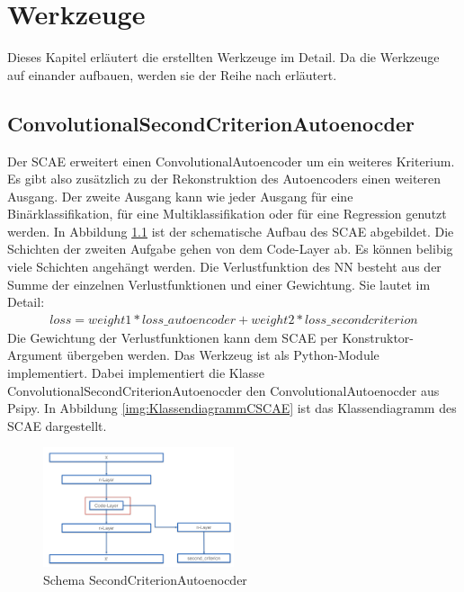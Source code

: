 \listoftodos


\chapter{Werkzeuge}
\label{chap:Werkzeuge}
Dieses Kapitel erläutert die erstellten Werkzeuge im Detail. Da die Werkzeuge auf einander aufbauen, werden sie der Reihe nach erläutert. 

	\section{ConvolutionalSecondCriterionAutoenocder}
	\label{sec:SecondCriterionAutoenocder}
	Der SCAE erweitert einen ConvolutionalAutoencoder um ein weiteres Kriterium. Es gibt also zusätzlich zu der Rekonstruktion des Autoencoders einen weiteren Ausgang. Der zweite Ausgang kann wie jeder Ausgang für eine Binärklassifikation, für eine Multiklassifikation oder für eine Regression genutzt werden. In Abbildung \ref{img:SchemaSCAE} ist der schematische Aufbau des SCAE abgebildet. Die Schichten der zweiten Aufgabe gehen von dem Code-Layer ab. Es können belibig viele Schichten angehängt werden. Die Verlustfunktion des NN besteht aus der Summe der einzelnen Verlustfunktionen und einer Gewichtung. Sie lautet im Detail: 
	\begin{align}
	loss = weight1 * loss\_autoencoder + weight2 * loss\_secondcriterion
	\end{align}
	Die Gewichtung der Verlustfunktionen kann dem SCAE per Konstruktor-Argument übergeben werden. Das Werkzeug ist als Python-Module implementiert. Dabei implementiert die Klasse ConvolutionalSecondCriterionAutoenocder den ConvolutionalAutoenocder aus Psipy. In Abbildung \ref{img:KlassendiagrammCSCAE} ist das Klassendiagramm des SCAE dargestellt.
	\begin{figure}[h]
		\centering
		\includegraphics[width=0.5\textwidth, center]{bilder/Schema_Autoencoders/Schema_SCAE.png}
		\caption[Schema SecondCriterionAutoenocder]{Schema SecondCriterionAutoenocder}
		\label{img:SchemaSCAE}
	\end{figure}  
